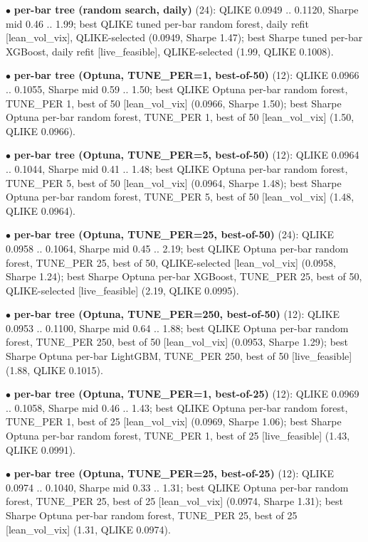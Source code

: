 \documentclass[10pt]{article}
\begin{document}
$\bullet$ \textbf{per-bar tree (random search, daily)} (24): QLIKE 0.0949 .. 0.1120, Sharpe mid 0.46 .. 1.99; best QLIKE tuned per-bar random forest, daily refit [lean\_vol\_vix], QLIKE-selected (0.0949, Sharpe 1.47); best Sharpe tuned per-bar XGBoost, daily refit [live\_feasible], QLIKE-selected (1.99, QLIKE 0.1008).\par
$\bullet$ \textbf{per-bar tree (Optuna, TUNE\_PER=1, best-of-50)} (12): QLIKE 0.0966 .. 0.1055, Sharpe mid 0.59 .. 1.50; best QLIKE Optuna per-bar random forest, TUNE\_PER 1, best of 50 [lean\_vol\_vix] (0.0966, Sharpe 1.50); best Sharpe Optuna per-bar random forest, TUNE\_PER 1, best of 50 [lean\_vol\_vix] (1.50, QLIKE 0.0966).\par
$\bullet$ \textbf{per-bar tree (Optuna, TUNE\_PER=5, best-of-50)} (12): QLIKE 0.0964 .. 0.1044, Sharpe mid 0.41 .. 1.48; best QLIKE Optuna per-bar random forest, TUNE\_PER 5, best of 50 [lean\_vol\_vix] (0.0964, Sharpe 1.48); best Sharpe Optuna per-bar random forest, TUNE\_PER 5, best of 50 [lean\_vol\_vix] (1.48, QLIKE 0.0964).\par
$\bullet$ \textbf{per-bar tree (Optuna, TUNE\_PER=25, best-of-50)} (24): QLIKE 0.0958 .. 0.1064, Sharpe mid 0.45 .. 2.19; best QLIKE Optuna per-bar random forest, TUNE\_PER 25, best of 50, QLIKE-selected [lean\_vol\_vix] (0.0958, Sharpe 1.24); best Sharpe Optuna per-bar XGBoost, TUNE\_PER 25, best of 50, QLIKE-selected [live\_feasible] (2.19, QLIKE 0.0995).\par
$\bullet$ \textbf{per-bar tree (Optuna, TUNE\_PER=250, best-of-50)} (12): QLIKE 0.0953 .. 0.1100, Sharpe mid 0.64 .. 1.88; best QLIKE Optuna per-bar random forest, TUNE\_PER 250, best of 50 [lean\_vol\_vix] (0.0953, Sharpe 1.29); best Sharpe Optuna per-bar LightGBM, TUNE\_PER 250, best of 50 [live\_feasible] (1.88, QLIKE 0.1015).\par
$\bullet$ \textbf{per-bar tree (Optuna, TUNE\_PER=1, best-of-25)} (12): QLIKE 0.0969 .. 0.1058, Sharpe mid 0.46 .. 1.43; best QLIKE Optuna per-bar random forest, TUNE\_PER 1, best of 25 [lean\_vol\_vix] (0.0969, Sharpe 1.06); best Sharpe Optuna per-bar random forest, TUNE\_PER 1, best of 25 [live\_feasible] (1.43, QLIKE 0.0991).\par
$\bullet$ \textbf{per-bar tree (Optuna, TUNE\_PER=25, best-of-25)} (12): QLIKE 0.0974 .. 0.1040, Sharpe mid 0.33 .. 1.31; best QLIKE Optuna per-bar random forest, TUNE\_PER 25, best of 25 [lean\_vol\_vix] (0.0974, Sharpe 1.31); best Sharpe Optuna per-bar random forest, TUNE\_PER 25, best of 25 [lean\_vol\_vix] (1.31, QLIKE 0.0974).\par
\end{document}
